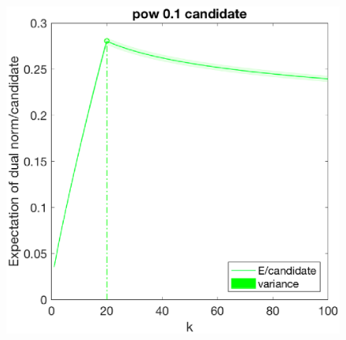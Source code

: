 \documentclass[12pt]{article}
\begin{document}
\begin{figure}[h]
\begin{minipage}[c]{.3\linewidth}
    \end{minipage}
    \hfill%
    \begin{minipage}[c]{.3\linewidth}
        \centering
        \includegraphics[width=\linewidth]{Fig/dualnorm-u0ones-k0-20-candidatepow.eps}
    \end{minipage}
\end{figure}
\end{document}
